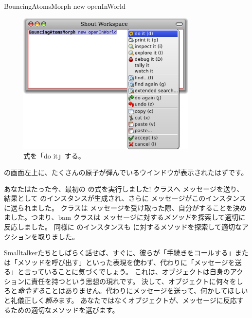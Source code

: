 \documentclass[a4paper,10pt,twoside]{book}
\begin{document}

\begin{code}{}
BouncingAtomsMorph new openInWorld
\end{code}


\begin{figure}[htb]
\centerline {\includegraphics[width=0.8\textwidth]{Doit}}
\caption{式を「do it」する。}
\end{figure}

\pharo の画面左上に、たくさんの原子が弾んでいるウインドウが表示されたはずです。

あなたはたった今、最初の \st の式を実行しました!
\bam クラスへ  メッセージを送り、結果として \bam のインスタンスが生成され、さらに  メッセージがこのインスタンスに送られました。
\bam クラスは  メッセージを受け取った際、自分がすることを決めました。つまり、bam クラスは  メッセージに対する\emph{メソッド}を探索して適切に反応しました。
同様に \bam のインスタンスも  に対するメソッドを探索して適切なアクションを取りました。

Smalltalkerたちとしばらく話せば、すぐに、彼らが「手続きをコールする」または「メソッドを呼び出す」といった表現を使わず、代わりに「メッセージを送る」と言っていることに気づくでしょう。
これは、オブジェクトは自身のアクションに責任を持つという思想の現れです。
決して、オブジェクトに何々をしろと\emph{命令する}ことはありません。代わりにメッセージを送って、何かしてほしいと礼儀正しく\emph{頼み}ます。
あなたではなくオブジェクトが、メッセージに反応するための適切なメソッドを選びます。
\end{document}
